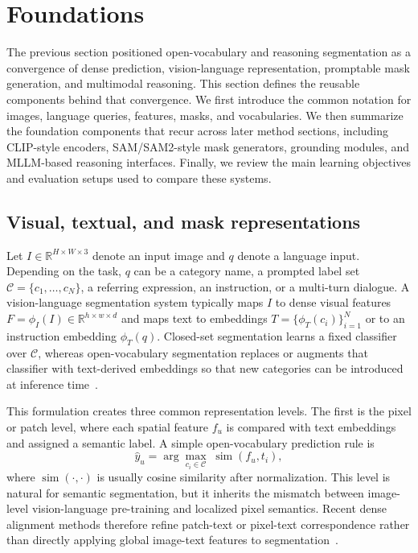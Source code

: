 \section{Foundations}
\label{sec:foundations}

The previous section positioned open-vocabulary and reasoning segmentation as a convergence of dense prediction, vision-language representation, promptable mask generation, and multimodal reasoning. This section defines the reusable components behind that convergence. We first introduce the common notation for images, language queries, features, masks, and vocabularies. We then summarize the foundation components that recur across later method sections, including CLIP-style encoders, SAM/SAM2-style mask generators, grounding modules, and MLLM-based reasoning interfaces. Finally, we review the main learning objectives and evaluation setups used to compare these systems.

\subsection{Visual, textual, and mask representations}

Let $I \in \mathbb{R}^{H \times W \times 3}$ denote an input image and $q$ denote a language input. Depending on the task, $q$ can be a category name, a prompted label set $\mathcal{C}=\{c_1,\ldots,c_N\}$, a referring expression, an instruction, or a multi-turn dialogue. A vision-language segmentation system typically maps $I$ to dense visual features $F=\phi_I(I)\in\mathbb{R}^{h\times w\times d}$ and maps text to embeddings $T=\{\phi_T(c_i)\}_{i=1}^{N}$ or to an instruction embedding $\phi_T(q)$. Closed-set segmentation learns a fixed classifier over $\mathcal{C}$, whereas open-vocabulary segmentation replaces or augments that classifier with text-derived embeddings so that new categories can be introduced at inference time~\citep{radford2021learning,liang2023ovseg,xshanOpenvocabularySemanticSegmentation2024}.

This formulation creates three common representation levels. The first is the pixel or patch level, where each spatial feature $f_u$ is compared with text embeddings and assigned a semantic label. A simple open-vocabulary prediction rule is
\begin{equation}
    \hat{y}_u = \arg\max_{c_i \in \mathcal{C}} \; \operatorname{sim}(f_u,t_i),
\end{equation}
where $\operatorname{sim}(\cdot,\cdot)$ is usually cosine similarity after normalization. This level is natural for semantic segmentation, but it inherits the mismatch between image-level vision-language pre-training and localized pixel semantics. Recent dense alignment methods therefore refine patch-text or pixel-text correspondence rather than directly applying global image-text features to segmentation~\citep{yangExploringCLIPsDense2025,yxchngAligningVisionLanguageModel2026}.

